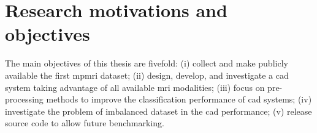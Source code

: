 \section{Research motivations and objectives}\label{sec:intro:motivation}

The main objectives of this thesis are fivefold: (i) collect and make publicly available the first \ac{mpmri} dataset; (ii) design, develop, and investigate a \ac{cad} system taking advantage of all available \ac{mri} modalities; (iii) focus on pre-processing methods to improve the classification performance of \ac{cad} systems; (iv) investigate the problem of imbalanced dataset in the \ac{cad} performance; (v) release source code to allow future benchmarking.
